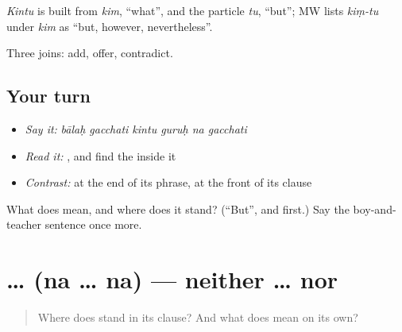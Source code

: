 \begin{cousinweb}
\emph{Kintu} is built from \emph{kim}, \textquotedblleft{}what\textquotedblright{}, and the particle \emph{tu}, \textquotedblleft{}but\textquotedblright{}; MW lists \emph{kiṃ-tu} under \emph{kim} as \textquotedblleft{}but, however, nevertheless\textquotedblright{}.
\end{cousinweb}

\begin{grammarlens}[title={What you've built}]
Three joins: add, offer, contradict.
\end{grammarlens}

\subsection*{Your turn}
\begin{itemize}
\raggedright
  \item \emph{Say it:} \emph{bālaḥ gacchati kintu guruḥ na gacchati}
  \item \emph{Read it:} \textbf{}, and find the \textbf{} inside it
  \item \emph{Contrast:} \textbf{} at the end of its phrase, \textbf{} at the front of its clause
\end{itemize}

\begin{tcolorbox}[breakable,colback=teal!4,colframe=teal!35!black,title={Before you move on}]
What does \textbf{} mean, and where does it stand? (\textquotedblleft{}But\textquotedblright{}, and first.) Say the boy-and-teacher sentence once more.
\end{tcolorbox}
\section[\texorpdfstring{\sk{न} … \sk{न} (na … na)}{न … न (na … na)}]{ …  (na … na) — neither … nor}

\label{lesson:SA-C52-na-na}



\begin{quote}
Where does \textbf{} stand in its clause? And what does \textbf{} mean on its own?
\end{quote}

